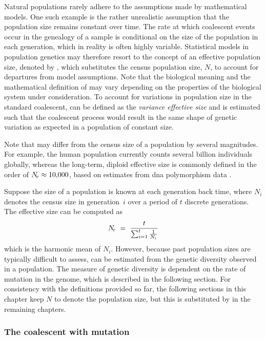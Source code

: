 Natural populations rarely adhere to the assumptions made by mathematical models.
One such example is the rather unrealistic assumption that the population size remains constant over time.
The rate at which coalescent events occur in the genealogy of a sample is conditional on the size of the population in each generation, which in reality is often highly variable.
Statistical models in population genetics may therefore resort to the concept of an effective population size, denoted by \Ne, which substitutes the census population size, $N$, to account for departures from model assumptions.
Note that the biological meaning and the mathematical definition of \Ne may vary depending on the properties of the biological system under consideration.
To account for variations in population size in the standard coalescent, \Ne can be defined as the \emph{variance effective size} and is estimated such that the coalescent process would result in the same shape of genetic variation as expected in a population of constant size.

Note that \Ne may differ from the census size of a population by several magnitudes.
For example, the human population currently counts several billion individuals globally, whereas the long-term, diploid effective size is commonly defined in the order of ${N_{\!e} \approx \num{10000}}$, based on estimates from \gls{dna} polymorphism data \citep[\eg][]{Takahata:1993ko,Yu:2001wl}.

Suppose the size of a population is known at each generation back time, where $N_i$ denotes the census size in generation~$i$ over a period of $t$ discrete generations.
The effective size can be computed as
\begin{equation}
	N_{\!e} ~=~ \frac{t}{ \sum_{i=1}^{t} \frac{1}{N_i} }
\end{equation}
which is the harmonic mean of $N_i$.
However, because past population sizes are typically difficult to assess, \Ne can be estimated from the genetic diversity observed in a population.
The measure of genetic diversity is dependent on the rate of mutation in the genome, which is described in the following section\label{ref:calceffpopsize}.
For consistency with the definitions provided so far, the following sections in this chapter keep $N$ to denote the population size, but this is substituted by \Ne in the remaining chapters.


%
\subsubsection{The coalescent with mutation}
\label{sec:coal_mutation}
%

